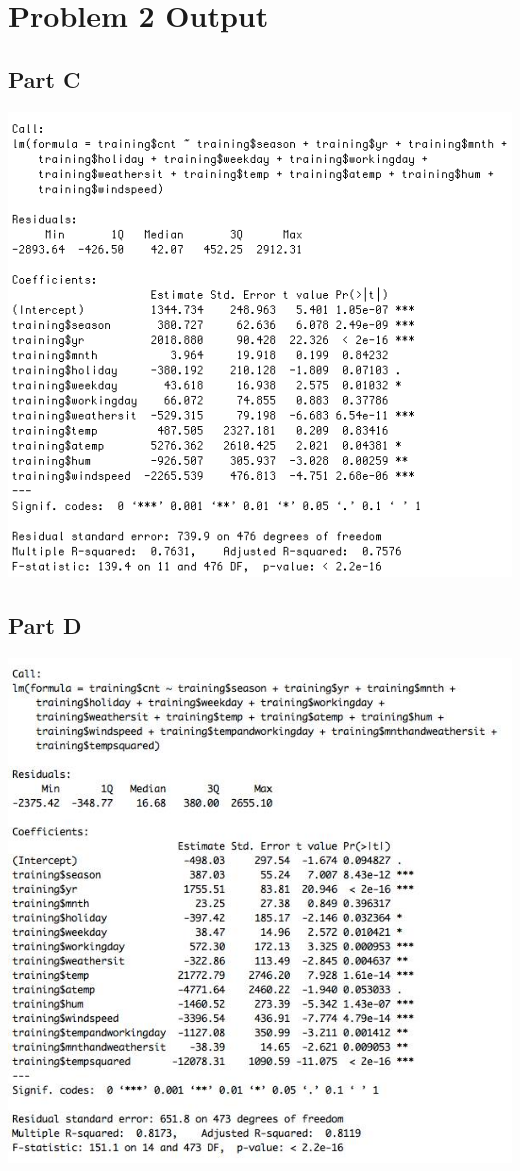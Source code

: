 \documentclass[11pt]{article}
\begin{document}
\section{Problem 2 Output}
\label{sec:problem2output}
\subsection{Part C}
\includegraphics{Output.jpg}
\label{sec:problem2coutput}
\subsection{Part D}
\includegraphics{Part2Doutput.jpg}
\label{sec:problem2doutput}
\pagebreak
\end{document}

